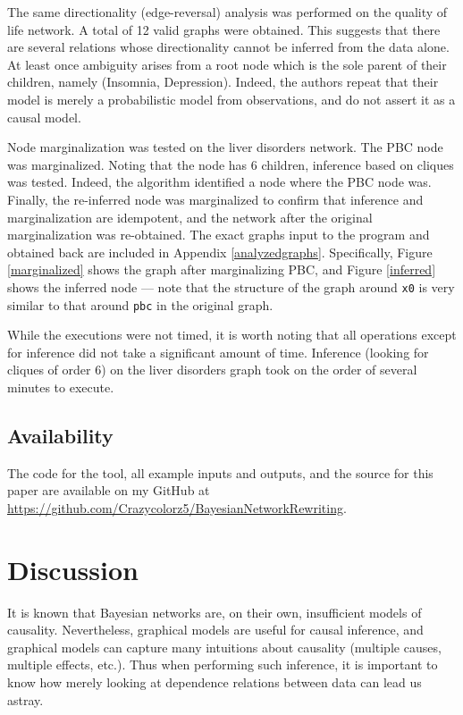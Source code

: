 \documentclass{article}
\begin{document}
	The same directionality (edge-reversal) analysis was performed on the quality of life network.
	A total of 12 valid graphs were obtained.
	This suggests that there are several relations whose directionality cannot be inferred from the data alone.
	At least once ambiguity arises from a root node which is the sole parent of their children, namely (Insomnia, Depression).
	Indeed, the authors repeat that their model is merely a probabilistic model from observations, and do not assert it as a causal model.
	
	Node marginalization was tested on the liver disorders network. The PBC node was marginalized.
	Noting that the node has 6 children, inference based on cliques was tested.
	Indeed, the algorithm identified a node where the PBC node was.
	Finally, the re-inferred node was marginalized to confirm that inference and marginalization are idempotent, and the network after the original marginalization was re-obtained.
	The exact graphs input to the program and obtained back are included in Appendix \ref{analyzedgraphs}.
	Specifically, Figure \ref{marginalized} shows the graph after marginalizing PBC, and Figure \ref{inferred} shows the inferred node --- note that the structure of the graph around \verb|x0| is very similar to that around \verb|pbc| in the original graph.
	
	While the executions were not timed, it is worth noting that all operations except for inference did not take a significant amount of time.
	Inference (looking for cliques of order 6) on the liver disorders graph took on the order of several minutes to execute.
	
	
	\subsection{Availability}
	The code for the tool, all example inputs and outputs, and the source for this paper are available on my GitHub at \url{https://github.com/Crazycolorz5/BayesianNetworkRewriting}.
	
	\section{Discussion}
	\label{discussion}
	
	It is known that Bayesian networks are, on their own, insufficient models of causality.
	Nevertheless, graphical models are useful for causal inference, and graphical models can capture many intuitions about causality (multiple causes, multiple effects, etc.).
	Thus when performing such inference, it is important to know how merely looking at dependence relations between data can lead us astray.
	
\end{document}
